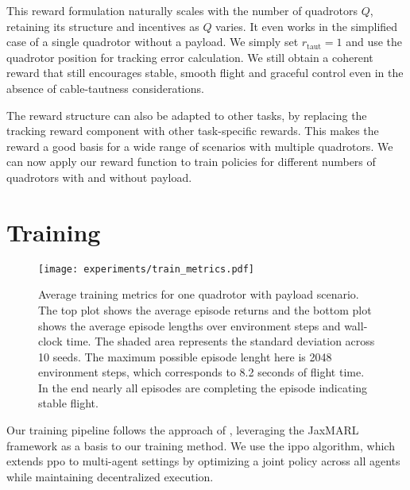 This reward formulation naturally scales with the number of quadrotors \(Q\), retaining its structure and incentives as \(Q\) varies. It even works in the simplified case of a single quadrotor without a payload. We simply set \(r_{\mathrm{taut}}=1\) and use the quadrotor position for tracking error calculation. We still obtain a coherent reward that still encourages stable, smooth flight and graceful control even in the absence of cable-tautness considerations.

The reward structure can also be adapted to other tasks, by replacing the tracking reward component with other task-specific rewards. This makes the reward a good basis for a wide range of scenarios with multiple quadrotors. We can now apply our reward function to train policies for different numbers of quadrotors with and without payload.




\section{Training}
\begin{figure}[ht]
    \centering
    
    \texttt{[image: experiments/train\_metrics.pdf]}
    \caption[Training metrics]{Average training metrics for one quadrotor with payload scenario. The top plot shows the average episode returns and the bottom plot shows the average episode lengths over environment steps and wall-clock time. The shaded area represents the standard deviation across 10 seeds. The maximum possible episode lenght here is 2048 environment steps, which corresponds to 8.2 seconds of flight time. In the end nearly all episodes are completing the episode indicating stable flight.}
    \label{fig:train_metrics}
\end{figure}
Our training pipeline follows the approach of \autocite{flair2023jaxmarl}, leveraging the JaxMARL framework as a basis to our training method. We use the \gls{ippo} algorithm, which extends \gls{ppo} to multi-agent settings by optimizing a joint policy across all agents while maintaining decentralized execution.

